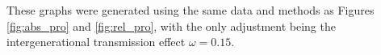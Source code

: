 
\begin{flushleft}
These graphs were generated using the same data and methods as Figures \ref{fig:abs_pro} and \ref{fig:rel_pro}, with the only adjustment being the intergenerational transmission effect \(\omega = 0.15\).
\end{flushleft}

\scalebox{0.5}{}

\scalebox{0.5}{}


